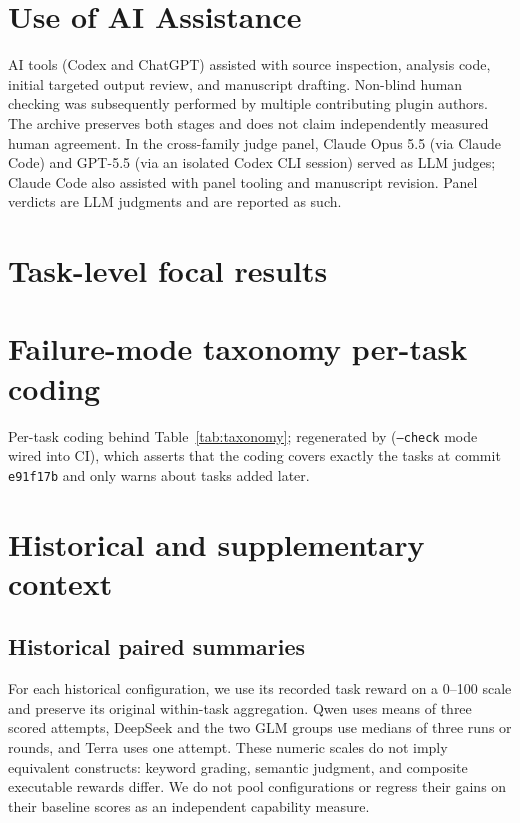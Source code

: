 \documentclass[11pt]{article}
\begin{document}
\section*{Use of AI Assistance}
AI tools (Codex and ChatGPT) assisted with source inspection, analysis code, initial targeted output review, and manuscript drafting. Non-blind human checking was subsequently performed by multiple contributing plugin authors. The archive preserves both stages and does not claim independently measured human agreement. In the cross-family judge panel, Claude Opus 5.5 (via Claude Code) and GPT-5.5 (via an isolated Codex CLI session) served as LLM judges; Claude Code also assisted with panel tooling and manuscript revision. Panel verdicts are LLM judgments and are reported as such.



\appendix
\clearpage
\section{Task-level focal results}


\section{Failure-mode taxonomy per-task coding}\label{app:taxonomy}
Per-task coding behind Table~\ref{tab:taxonomy}; regenerated by  (\texttt{--check} mode wired into CI), which asserts that the coding covers exactly the tasks at commit \texttt{e91f17b} and only warns about tasks added later.



\section{Historical and supplementary context}\label{app:historical}
\subsection{Historical paired summaries}\label{sec:paired}
For each historical configuration, we use its recorded task reward on a 0--100 scale and preserve its original within-task aggregation. Qwen uses means of three scored attempts, DeepSeek and the two GLM groups use medians of three runs or rounds, and Terra uses one attempt. These numeric scales do not imply equivalent constructs: keyword grading, semantic judgment, and composite executable rewards differ. We do not pool configurations or regress their gains on their baseline scores as an independent capability measure.
\end{document}
